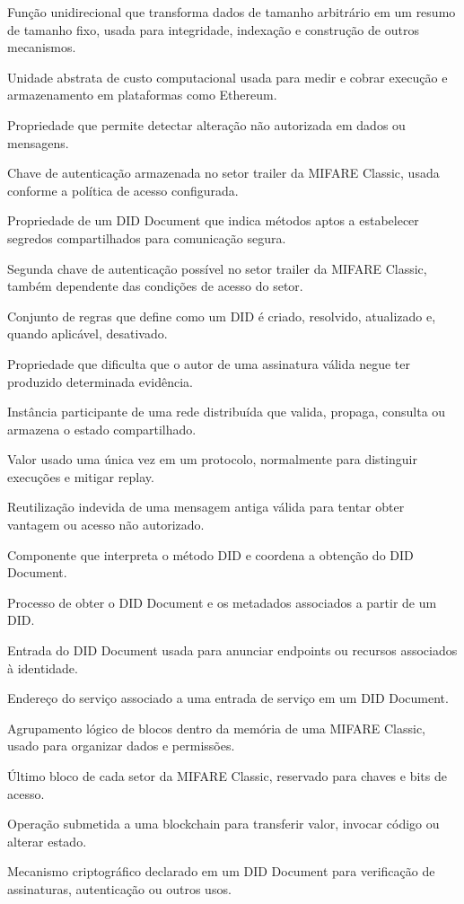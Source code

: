 \begin{description}[
  font=\normalfont\bfseries,
  style=multiline,
  leftmargin=5.8cm,
  labelwidth=5.1cm,
  labelsep=0.35cm,
  itemsep=0.55\baselineskip
]
  \item[Função hash criptográfica] Função unidirecional que transforma dados de tamanho arbitrário em um resumo de tamanho fixo, usada para integridade, indexação e construção de outros mecanismos.
  \item[Gas] Unidade abstrata de custo computacional usada para medir e cobrar execução e armazenamento em plataformas como Ethereum.
  \item[Integridade] Propriedade que permite detectar alteração não autorizada em dados ou mensagens.
  \item[Key A] Chave de autenticação armazenada no setor trailer da MIFARE Classic, usada conforme a política de acesso configurada.
  \item[Key Agreement] Propriedade de um DID Document que indica métodos aptos a estabelecer segredos compartilhados para comunicação segura.
  \item[Key B] Segunda chave de autenticação possível no setor trailer da MIFARE Classic, também dependente das condições de acesso do setor.
  \item[Método DID] Conjunto de regras que define como um DID é criado, resolvido, atualizado e, quando aplicável, desativado.
  \item[Não repúdio] Propriedade que dificulta que o autor de uma assinatura válida negue ter produzido determinada evidência.
  \item[Nó] Instância participante de uma rede distribuída que valida, propaga, consulta ou armazena o estado compartilhado.
  \item[Nonce] Valor usado uma única vez em um protocolo, normalmente para distinguir execuções e mitigar replay.
  \item[Replay] Reutilização indevida de uma mensagem antiga válida para tentar obter vantagem ou acesso não autorizado.
  \item[Resolver] Componente que interpreta o método DID e coordena a obtenção do DID Document.
  \item[Resolução de DID] Processo de obter o DID Document e os metadados associados a partir de um DID.
  \item[Service] Entrada do DID Document usada para anunciar endpoints ou recursos associados à identidade.
  \item[Service Endpoint] Endereço do serviço associado a uma entrada de serviço em um DID Document.
  \item[Setor] Agrupamento lógico de blocos dentro da memória de uma MIFARE Classic, usado para organizar dados e permissões.
  \item[Setor trailer] Último bloco de cada setor da MIFARE Classic, reservado para chaves e bits de acesso.
  \item[Transação] Operação submetida a uma blockchain para transferir valor, invocar código ou alterar estado.
  \item[Verification Method] Mecanismo criptográfico declarado em um DID Document para verificação de assinaturas, autenticação ou outros usos.
\end{description}

